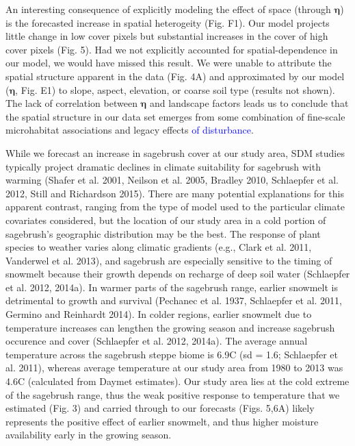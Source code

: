 \documentclass[12pt,]{article}
\begin{document}
An interesting consequence of explicitly modeling the effect of space
(through \(\boldsymbol{\eta}\)) is the forecasted increase in spatial
heterogeity (Fig. F1). Our model projects little change in low cover
pixels but substantial increases in the cover of high cover pixels (Fig.
5). Had we not explicitly accounted for spatial-dependence in our model,
we would have missed this result. We were unable to attribute the
spatial structure apparent in the data (Fig. 4A) and approximated by our
model (\(\boldsymbol{\eta}\), Fig. E1) to slope, aspect, elevation, or
coarse soil type (results not shown). The lack of correlation between
\(\boldsymbol{\eta}\) and landscape factors leads us to conclude that
the spatial structure in our data set emerges from some combination of
fine-scale microhabitat associations and legacy effects
\textcolor{blue}{of disturbance}.

While we forecast an increase in sagebrush cover at our study area, SDM
studies typically project dramatic declines in climate suitability for
sagebrush with warming (Shafer et al. 2001, Neilson et al. 2005, Bradley
2010, Schlaepfer et al. 2012, Still and Richardson 2015). There are many
potential explanations for this apparent contrast, ranging from the type
of model used to the particular climate covariates considered, but the
location of our study area in a cold portion of sagebrush's geographic
distribution may be the best. The response of plant species to weather
varies along climatic gradients (e.g., Clark et al. 2011, Vanderwel et
al. 2013), and sagebrush are especially sensitive to the timing of
snowmelt because their growth depends on recharge of deep soil water
(Schlaepfer et al. 2012, 2014a). In warmer parts of the sagebrush range,
earlier snowmelt is detrimental to growth and survival (Pechanec et al.
1937, Schlaepfer et al. 2011, Germino and Reinhardt 2014). In colder
regions, earlier snowmelt due to temperature increases can lengthen the
growing season and increase sagebrush occurence and cover (Schlaepfer et
al. 2012, 2014a). The average annual temperature across the sagebrush
steppe biome is 6.9\textdegree C (sd = 1.6; Schlaepfer et al. 2011),
whereas average temperature at our study area from 1980 to 2013 was
4.6\textdegree C (calculated from Daymet estimates). Our study area lies
at the cold extreme of the sagebrush range, thus the weak positive
response to temperature that we estimated (Fig. 3) and carried through
to our forecasts (Figs. 5,6A) likely represents the positive effect of
earlier snowmelt, and thus higher moisture availability early in the
growing season.
\end{document}
